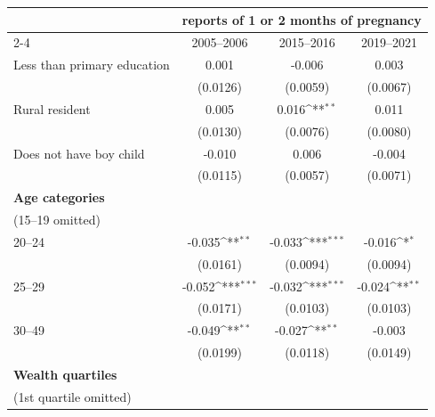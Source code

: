 {
\def\sym#1{\ifmmode^{#1}\else\(^{#1}\)\fi}
\begin{tabular}{l*{3}{c}}
\toprule
                    &\multicolumn{3}{c}{reports of 1 or 2 months of pregnancy}        \\\cmidrule(lr){2-4}
                    &\multicolumn{1}{c}{2005--2006}&\multicolumn{1}{c}{2015--2016}&\multicolumn{1}{c}{2019--2021}\\
\midrule
\hspace*{1em}Less than primary education&       0.001         &      -0.006         &       0.003         \\
                    &    (0.0126)         &    (0.0059)         &    (0.0067)         \\
\addlinespace
\hspace*{1em}Rural resident&       0.005         &       0.016\sym{**} &       0.011         \\
                    &    (0.0130)         &    (0.0076)         &    (0.0080)         \\
\addlinespace
\hspace*{1em}Does not have boy child&      -0.010         &       0.006         &      -0.004         \\
                    &    (0.0115)         &    (0.0057)         &    (0.0071)         \\
\addlinespace
\textbf{Age categories} \\ (15--19 omitted)&                     &                     &                     \\
\addlinespace
\hspace*{1em}20--24 &      -0.035\sym{**} &      -0.033\sym{***}&      -0.016\sym{*}  \\
                    &    (0.0161)         &    (0.0094)         &    (0.0094)         \\
\addlinespace
\hspace*{1em}25--29 &      -0.052\sym{***}&      -0.032\sym{***}&      -0.024\sym{**} \\
                    &    (0.0171)         &    (0.0103)         &    (0.0103)         \\
\addlinespace
\hspace*{1em}30--49 &      -0.049\sym{**} &      -0.027\sym{**} &      -0.003         \\
                    &    (0.0199)         &    (0.0118)         &    (0.0149)         \\
\addlinespace
\textbf{Wealth quartiles} \\ (1st quartile omitted)&                     &                     &                     \\

\end{tabular}}
